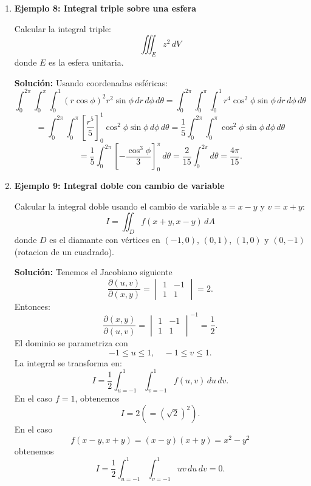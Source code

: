 \documentclass[11pt]{book}
\theoremstyle{definicion}
\theoremstyle{teorema}
\theoremstyle{ejemplo}
\begin{document}
\begin{enumerate}
\item \textbf{Ejemplo 8: Integral triple sobre una esfera}

Calcular la integral triple:
\[
\iiint_E z^2 \, dV
\]
donde \( E \) es la esfera unitaria.

\textbf{Solución:}
Usando coordenadas esféricas:
\[
\int_{0}^{2\pi} \int_{0}^{\pi} \int_{0}^{1} (r \cos \phi)^2 r^2 \sin \phi \, dr \, d\phi \, d\theta = \int_{0}^{2\pi} \int_{0}^{\pi} \int_{0}^{1} r^4 \cos^2 \phi \sin \phi \, dr \, d\phi \, d\theta 
\]
\[
= \int_{0}^{2\pi} \int_{0}^{\pi} \left[ \frac{r^5}{5} \right]_{0}^{1} \cos^2 \phi \sin \phi \, d\phi \, d\theta 
= \frac{1}{5} \int_{0}^{2\pi} \int_{0}^{\pi} \cos^2 \phi \sin \phi \, d\phi \, d\theta
\]
\[
= \frac{1}{5} \int_{0}^{2\pi} \left[ -\frac{\cos^3 \phi}{3} \right]_{0}^{\pi} \, d\theta = \frac{2}{15} \int_{0}^{2\pi} d\theta = \frac{4\pi}{15}.
\]

\item \textbf{Ejemplo 9: Integral doble con cambio de variable}

Calcular la integral doble usando el cambio de variable \( u = x - y \) y \( v = x + y \):
\[
I = \iint_D f(x+y,x-y) \, dA
\]
donde \( D \) es el diamante con vértices en \( (-1,0) \), \( (0,1) \), \( (1,0) \) y \( (0,-1) \) (rotacion de un cuadrado).

\textbf{Solución:}
Tenemos el Jacobiano siguiente
\[
\frac{\partial(u, v)}{\partial(x, y)} = \begin{vmatrix}
1 & -1 \\
1 & 1
\end{vmatrix} = 2.
\]
Entonces:
\[
\frac{\partial(x, y)}{\partial(u, v)} = \begin{vmatrix}
1 & -1 \\
1 & 1
\end{vmatrix}^{-1} = \frac{1}{2}.
\]
El dominio se parametriza con
\[
-1 \leq u \leq 1, \quad 
-1 \leq v \leq 1. 
\]
La integral se transforma en:
\[
I = \frac{1}{2}\int_{u=-1}^{1} \int_{v=-1}^{1} f(u,v) \, du \, dv.
\]
En el caso $f=1$, obtenemos
\[
I = 2 (=(\sqrt{2})^2).
\]
En el caso
\[
f(x-y,x+y)=(x-y)(x+y)=x^2 - y^2
\]
obtenemos
\[
I = \frac{1}{2}\int_{u=-1}^{1} \int_{v=-1}^{1} uv \, du \, dv = 0.
\]


\end{enumerate}
\end{document}
